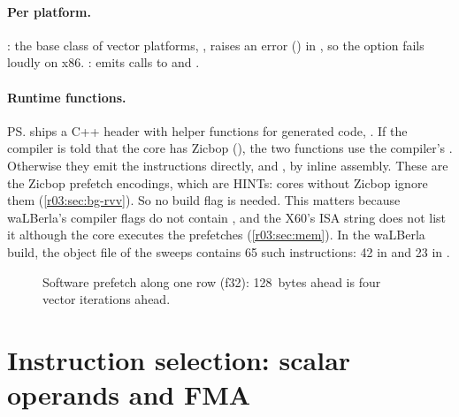 \paragraph{Per platform.} : the base
class of vector platforms, , raises an error
() in , so the option fails loudly on x86.
:  emits calls
to  and .

\paragraph{Runtime functions.} \ps{} ships a C++ header with helper functions for generated
code, . If the compiler is told that
the core has Zicbop (), the two functions use the compiler's
. Otherwise they emit the instructions directly, 
and , by inline assembly. These are the Zicbop prefetch encodings, which
are HINTs: cores without Zicbop ignore them (\cref{r03:sec:bg-rvv}). So no build flag is
needed. This matters because waLBerla's compiler flags do not contain , and the
X60's ISA string does not list it although the core executes the prefetches
(\cref{r03:sec:mem}). In the waLBerla build, the object file of the 
sweeps contains 65 such instructions: 42 in  and 23 in .

\begin{figure}[htbp]
  \centering
  \resizebox{\linewidth}{!}{}
  \caption[Software prefetch distance]{Software prefetch along one row (f32): 128~bytes ahead
    is four vector iterations ahead.}\label{r03:fig:prefetch}
\end{figure}

\section{Instruction selection: scalar operands and FMA}\label{r03:sec:ps-selector}

